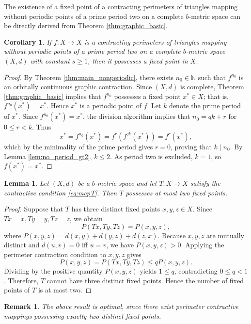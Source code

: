 \documentclass[a4paper,12pt,oneside]{article}
\newtheorem{lemma}[theorem]{Lemma}
\newtheorem{corollary}[theorem]{Corollary}
\newtheorem{remark}[theorem]{Remark}
\numberwithin{equation}{section}
\begin{document}
The existence of a fixed point of a contracting perimeters of triangles mapping without periodic points of a prime period two on a complete $b$-metric space can be directly derived from Theorem \ref{thm:graphic_basic}.

\begin{corollary}
\label{cor:fixedpoint}
If $f:X\to X$ is a  contracting perimeters of triangles mapping without periodic points of a prime period two on a complete $b$-metric space $(X,d)$ with constant $s\geq 1$, then it possesses a fixed point in $X$.
\end{corollary}

\begin{proof}
By Theorem \ref{thm:main_nonperiodic}, there exists $n_{0}\in \mathbb{N}$ such that $f^{n_{0}}$ is an orbitally continuous graphic contraction. Since $(X,d)$ is complete, Theorem \ref{thm:graphic_basic} implies that $f^{n_{0}}$ possesses a fixed point $x^{*}\in X$; that is, $f^{n_{0}}(x^{*}) = x^{*}$. Hence $x^{*}$ is a periodic point of $f$. Let $k$ denote the prime period of $x^*$. Since $f^{n_0}(x^*) = x^*$, the division algorithm implies that $n_0 = qk + r$ for $0 \le r < k$. Thus
\[
x^* = f^{n_0}(x^*) = f^r(f^{qk}(x^*)) = f^r(x^*),
\]
which by the minimality of the prime period gives $r = 0$, proving that $k \mid n_0$. By Lemma \ref{lem:no_period_gt2}, $k\leq 2$. As period two is excluded, $k=1$, so $f(x^{*})=x^{*}$.
\end{proof}

\begin{lemma}
\label{lem:atmost2fixed}
Let $(X,d)$ be a $b$-metric space and let $T:X\to X$ satisfy the contractive condition \eqref{eq:mcpT}. Then $T$ possesses at most two fixed points.
\end{lemma}

\begin{proof}
Suppose that $T$ has three distinct fixed points $x,y,z\in X$. Since $Tx=x, Ty=y, Tz=z$, we obtain
\[
P(Tx,Ty,Tz) = P(x,y,z),
\]
where $P(x,y,z) = d(x,y) + d(y,z) + d(z,x)$. Because $x,y,z$ are mutually distinct and $d(u,v) = 0$ iff $u=v$, we have $P(x,y,z) > 0$. Applying the perimeter contraction condition to $x,y,z$ gives
\[
P(x,y,z) = P(Tx,Ty,Tz)\leq qP(x,y,z).
\]
Dividing by the positive quantity $P(x,y,z)$ yields $1\leq q$, contradicting $0\leq q<1$. Therefore, $T$ cannot have three distinct fixed points. Hence the number of fixed points of $T$ is at most two.
\end{proof}

\begin{remark}
\label{rem:optimal_fixed}
The above result is optimal, since there exist perimeter contractive mappings possessing exactly two distinct fixed points.
\end{remark}
\end{document}
